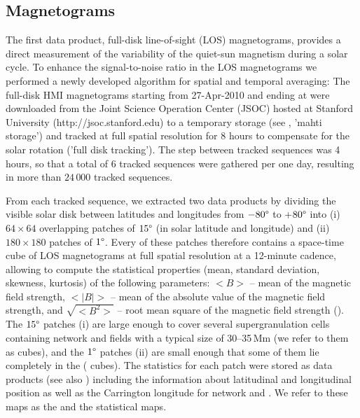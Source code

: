 \documentclass{aa}
\begin{document}

\subsection{Magnetograms}

The first data product, full-disk line-of-sight (LOS) magnetograms, provides a direct measurement of the variability of the quiet-sun magnetism during a solar cycle. To enhance the signal-to-noise ratio in the LOS magnetograms we performed a newly developed algorithm for spatial and temporal averaging: The full-disk HMI magnetograms starting from 27-Apr-2010 and ending at  were downloaded from the Joint Science Operation Center (JSOC) hosted at Stanford University (http://jsoc.stanford.edu) to a temporary storage (see , 'mahti storage') and tracked at full spatial resolution for 8 hours to compensate for the solar rotation ('full disk tracking').
The step between tracked sequences was 4 hours, so that a total of 6 tracked sequences were gathered per one day, resulting in more than $24\,000$ tracked sequences.

From each tracked sequence, we extracted two data products by dividing the visible solar disk  between latitudes and longitudes from $-80\degree$ to +$80\degree$ into (i) $64\times 64$  overlapping patches of $15\degree$ (in solar latitude and longitude)  and (ii) $180\times 180$ patches of $1\degree$.
Every of these patches therefore contains a space-time cube of LOS magnetograms at full spatial resolution at a 12-minute cadence, allowing to compute the statistical properties (mean, standard deviation, skewness, kurtosis) of the following parameters: $<B>$ -- mean of the magnetic field strength, $<|B|>$ -- mean of the absolute value of the magnetic field strength, and $\sqrt{<B^2>}$ -- root mean square of the magnetic field strength (\brms{}). The $15\degree$ patches (i) are large enough to cover several supergranulation cells containing network and \IN{} fields \cite[]{2010LRSP....7....2R} with a typical size of 30--35\,Mm (we refer to them as \nw{} cubes), and the $1\degree$ patches (ii) are small enough that some of them lie completely in the \IN{} (\inw{} cubes). 
The statistics for each patch were stored as data products (see also ) including the information about latitudinal and longitudinal position as well as the Carrington longitude for network and \IN{}. We refer to these maps as the \nw{} and the \inw{} statistical maps.
\end{document}
